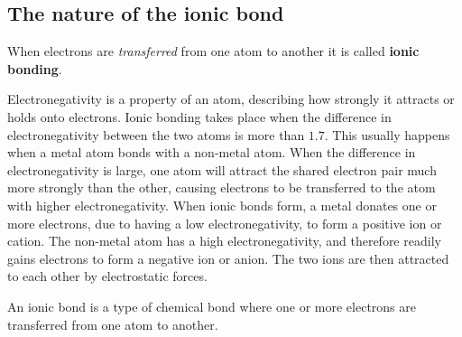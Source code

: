             \subsection*{The nature of the ionic bond}
            \nopagebreak
        \label{m38684*id142190}When electrons are \textsl{transferred} from one atom to another it is called \textbf{ionic bonding}.\par 
        \label{m38684*id142218}Electronegativity is a property of an atom, describing how strongly it attracts or holds onto electrons. Ionic bonding takes place when the difference in electronegativity between the two atoms is more than $1.7$. This usually happens when a metal atom bonds with a non-metal atom. When the difference in electronegativity is large, one atom will attract the shared electron pair much more strongly than the other, causing electrons to be transferred to the atom with higher electronegativity. When ionic bonds form, a metal donates one or more electrons, due to having a low electronegativity, to form a positive ion or cation. The non-metal atom has a high electronegativity, and therefore readily gains electrons to form a negative ion or anion. The two ions are then attracted to each other by electrostatic forces. \par 
{}
\label{m38684*fhsst!!!underscore!!!id456}
 {  An ionic bond is a type of chemical bond where one or more electrons are transferred from one atom to another. } 

